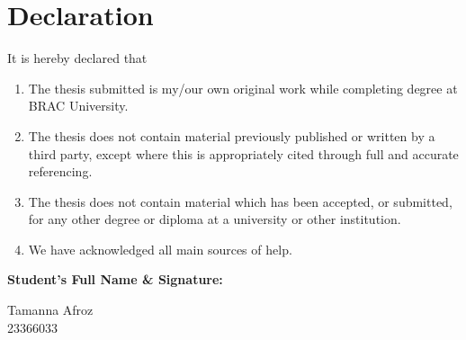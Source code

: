 \newcommand*\wildcard[2][6cm]{\vspace{2cm}\parbox{#1}{\hrulefill\par#2}} 


\section*{Declaration}

It is hereby declared that

\begin{enumerate} %
  \item The thesis submitted is my/our own original work while completing degree at BRAC University.
  \item The thesis does not contain material previously published or written by a third party, except where this is appropriately cited through full and accurate referencing.
  \item The thesis does not contain material which has been accepted, or submitted, for any other degree or diploma at a university or other institution.
  \item We have acknowledged all main sources of help.
\end{enumerate}

\vspace{1cm}
\textbf{Student’s Full Name \& Signature:} %

\begingroup

    \begin{center}
        \wildcard{\centering Tamanna Afroz \\ 23366033}
    \end{center}

\endgroup


\pagebreak





